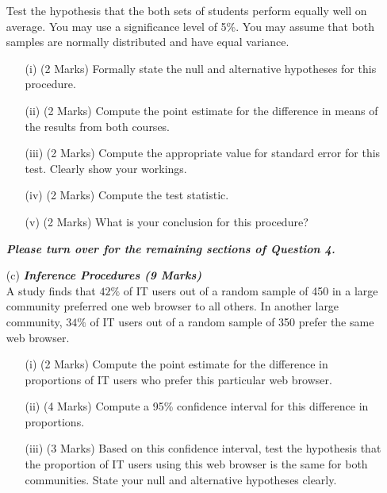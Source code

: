 \documentclass[a4paper,12pt]{article}
\begin{document}
\begin{itemize}
Test the hypothesis that the both sets of students perform equally well on average. You may use a significance level of 5\%. You may assume that both samples are normally distributed and have equal variance.
\begin{itemize}
\item[(i)] (2 Marks) Formally state the null and alternative hypotheses for this procedure.
\item[(ii)] (2 Marks) Compute the point estimate for the difference in means of the results from both courses.
\item[(iii)] (2 Marks) Compute the appropriate value for standard error for this test. Clearly show your workings.
\item[(iv)] (2 Marks) Compute the test statistic.
\item[(v)] (2 Marks) What is your conclusion for this procedure?
\end{itemize}
{
\normalsize
\textit{\textbf{Please turn over for the remaining sections of Question 4.}}
}
\newpage
\item[(c)] \textbf{\textit{Inference Procedures (9 Marks)}}\\A study finds that $42\%$ of IT users out of a random sample of 450 in a large
community preferred one web browser to all others. In another large community, $34\%$ of IT users out of a random sample of 350 prefer the same web browser.

\begin{itemize}
\item[(i)] (2 Marks) Compute the point estimate for the difference in proportions of IT users who prefer this particular web browser.
\item[(ii)] (4 Marks) Compute a 95\% confidence interval for this difference in proportions.
\item[(iii)] (3 Marks) Based on this confidence interval, test the hypothesis that the proportion of IT users using this web browser is the same for both communities. State your null and alternative hypotheses clearly.
\end{itemize}

\end{itemize}

\newpage
\end{document}
